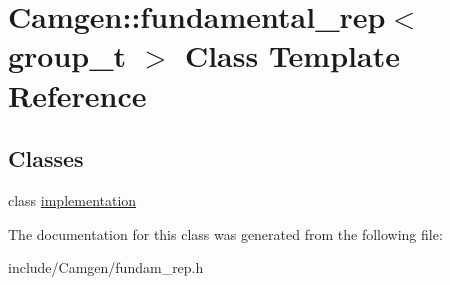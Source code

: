 \hypertarget{a00232}{\section{Camgen\-:\-:fundamental\-\_\-rep$<$ group\-\_\-t $>$ Class Template Reference}
\label{a00232}
}
\subsection*{Classes}
\begin{DoxyCompactItemize}
\item 
class \hyperlink{a00287}{implementation}
\end{DoxyCompactItemize}


The documentation for this class was generated from the following file\-:\begin{DoxyCompactItemize}
\item 
include/\-Camgen/fundam\-\_\-rep.\-h\end{DoxyCompactItemize}
